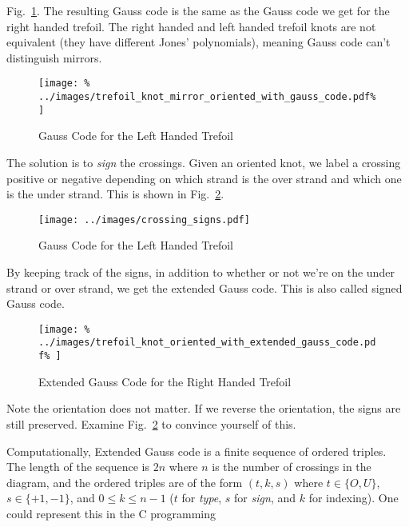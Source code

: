 \documentclass{article}
\theoremstyle{plain}
\begin{document}
        Fig.~\ref{fig:left_handed_trefoil_gauss_code}. The resulting Gauss code
        is the same as the Gauss code we get for the right handed trefoil.
        The right handed and left handed trefoil knots are not equivalent
        (they have different Jones' polynomials), meaning Gauss code can't
        distinguish mirrors.
        \begin{figure}
            \centering
            \texttt{[image: \%
                ../images/trefoil\_knot\_mirror\_oriented\_with\_gauss\_code.pdf\%
            ]}
            \caption{Gauss Code for the Left Handed Trefoil}
            \label{fig:left_handed_trefoil_gauss_code}
        \end{figure}
        The solution is to \textit{sign} the crossings. Given an oriented knot,
        we label a crossing positive or negative depending on which strand is
        the over strand and which one is the under strand. This is shown in
        Fig.~\ref{fig:crossing_signs}.
        \begin{figure}
            \centering
            \texttt{[image: ../images/crossing\_signs.pdf]}
            \caption{Gauss Code for the Left Handed Trefoil}
            \label{fig:crossing_signs}
        \end{figure}
        By keeping track of the signs, in addition to whether or not we're on
        the under strand or over strand, we get the extended Gauss code. This
        is also called signed Gauss code.
        \begin{figure}
            \centering
            \texttt{[image: \%
                ../images/trefoil\_knot\_oriented\_with\_extended\_gauss\_code.pdf\%
            ]}
            \caption{Extended Gauss Code for the Right Handed Trefoil}
            \label{fig:right_hand_trefoil_extended_gauss}
        \end{figure}
        Note the orientation does not matter. If we reverse the orientation,
        the signs are still preserved. Examine Fig.~\ref{fig:crossing_signs} to
        convince yourself of this.
        \par\hfill\par
        Computationally, Extended Gauss code is a finite sequence of ordered
        triples. The length of the sequence is $2n$ where $n$ is the number of
        crossings in the diagram, and the ordered triples are of the form
        $(t,k,s)$ where $t\in\{O,U\}$, $s\in\{+1,-1\}$, and
        $0\leq{k}\leq{n-1}$ ($t$ for \textit{type}, $s$ for \textit{sign}, and
        $k$ for indexing). One could represent this in the C programming
\end{document}
